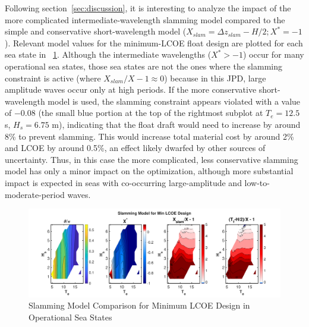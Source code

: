 Following section~\ref{sec:discussion}, it is interesting to analyze the impact of the more complicated intermediate-wavelength slamming model compared to the simple and conservative short-wavelength model ($X_{slam}=\Delta z_{slam}-H/2; X^*=-1$).
Relevant model values for the minimum-LCOE float design are plotted for each sea state in \figureautorefname~\ref{fig:slamming-validation}.
Although the intermediate wavelengths ($X^*>-1$) occur for many operational sea states, those sea states are not the ones where the slamming constraint is active (where $X_{slam}/X-1 \approx 0$) because in this JPD, large amplitude waves occur only at high periods.
If the more conservative short-wavelength model is used, the slamming constraint appears violated with a value of $-0.08$ (the small blue portion at the top of the rightmost subplot at $T_e=12.5$ s, $H_s=6.75$ m), indicating that the float draft would need to increase by around 8\% to prevent slamming.
This would increase total material cost by around 2\% and LCOE by around 0.5\%, an effect likely dwarfed by other sources of uncertainty.
Thus, in this case the more complicated, less conservative slamming model has only a minor impact on the optimization, although more substantial impact is expected in seas with co-occurring large-amplitude and low-to-moderate-period waves. 
\begin{figure}
    \centering
    \includegraphics[width=1\linewidth]{figs/2025-04-11_10.21.55/slam_validation.pdf}
    \caption{Slamming Model Comparison for Minimum LCOE Design in Operational Sea States}
    \label{fig:slamming-validation}
\end{figure}



\clearpage
